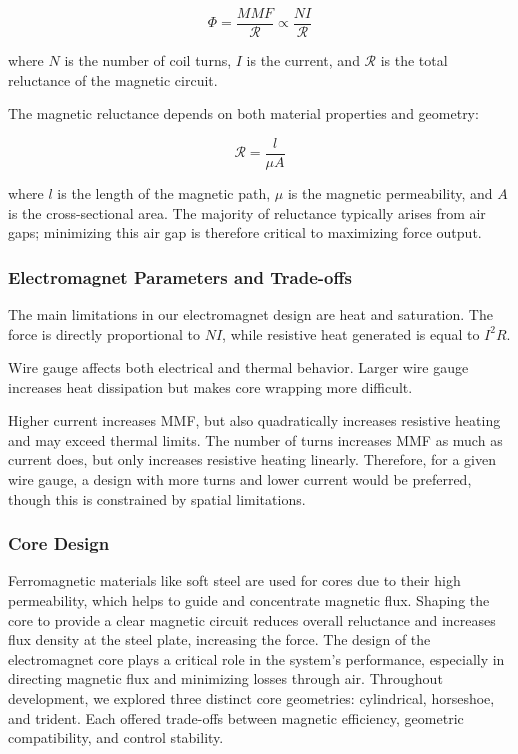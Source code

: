 \documentclass[11pt]{article} %
\begin{document}
\[
\Phi = \frac{MMF}{\mathcal{R}} \propto \frac{NI}{\mathcal{R}}
\]

where $N$ is the number of coil turns, $I$ is the current, and $\mathcal{R}$ is the total reluctance of the magnetic circuit.

The magnetic reluctance depends on both material properties and geometry:

\[
\mathcal{R} = \frac{l}{\mu A}
\]

where $l$ is the length of the magnetic path, $\mu$ is the magnetic permeability, and $A$ is the cross-sectional area. The majority of reluctance typically arises from air gaps; minimizing this air gap is therefore critical to maximizing force output.

\subsubsection*{Electromagnet Parameters and Trade-offs}

The main limitations in our electromagnet design are heat and saturation. The force is directly proportional to $NI$, while resistive heat generated is equal to $I^2R$.

Wire gauge affects both electrical and thermal behavior. Larger wire gauge increases heat dissipation but makes core wrapping more difficult.

Higher current increases MMF, but also quadratically increases resistive heating and may exceed thermal limits. The number of turns increases MMF as much as current does, but only increases resistive heating linearly. Therefore, for a given wire gauge, a design with more turns and lower current would be preferred, though this is constrained by spatial limitations.

\subsubsection{Core Design}

Ferromagnetic materials like soft steel are used for cores due to their high permeability, which helps to guide and concentrate magnetic flux. Shaping the core to provide a clear magnetic circuit reduces overall reluctance and increases flux density at the steel plate, increasing the force. The design of the electromagnet core plays a critical role in the system's performance, especially in directing magnetic flux and minimizing losses through air. Throughout development, we explored three distinct core geometries: cylindrical, horseshoe, and trident. Each offered trade-offs between magnetic efficiency, geometric compatibility, and control stability.
\end{document}
